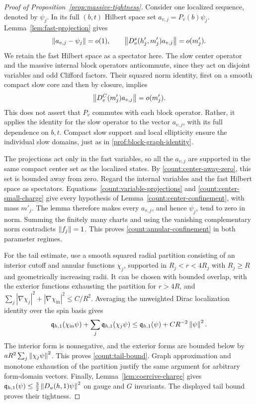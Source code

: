 \begin{proof}[Proof of Proposition~\ref{prop:massive-tightness}]
Consider one localized sequence, denoted by \(\psi_j\). In its full
\((b,t)\) Hilbert space set
\(a_{v,j}=P_v(b)\psi_j\). Lemma~\ref{lem:fast-projection} gives
\begin{equation}\label{count:variable-projections}
 \left\lVert a_{v,j}-\psi_j\right\rVert=o(1),\qquad
 \left\lVert D_v^s(h'_j,m'_j)a_{v,j}\right\rVert=o(m'_j).
\end{equation}
We retain the fast Hilbert space as a spectator here. The slow center
operator and the massive internal block operators anticommute, since
they act on disjoint variables and odd Clifford factors. Their squared
norm identity, first on a smooth compact slow core and then by closure,
implies
\begin{equation}\label{count:center-small-charge}
                    \left\lVert D_v^C(m'_j)a_{v,j}\right\rVert=o(m'_j).
\end{equation}
This does not assert that \(P_v\) commutes with each block operator.
Rather, it applies the identity for the slow operator to the vector
\(a_{v,j}\), with its full dependence on \(b,t\). Compact slow support
and local ellipticity ensure the individual slow domains, just as in
\eqref{prof:block-graph-identity}.

The projections act only in the fast variables, so all the
\(a_{v,j}\) are supported in the same compact center set as the localized
states. By \eqref{count:center-away-zero}, this set is bounded away
from zero. Regard the internal variables and the fast Hilbert space as
spectators. Equations~\eqref{count:variable-projections} and
\eqref{count:center-small-charge} give every hypothesis of
Lemma~\ref{count:center-confinement}, with mass \(m'_j\).
The lemma therefore makes every \(a_{v,j}\), and hence \(\psi_j\),
tend to zero in norm. Summing the finitely many charts and using the
vanishing complementary norm contradicts \(\left\lVert f_j\right\rVert=1\).
This proves \eqref{count:annular-confinement} in both parameter regimes.

For the tail estimate, use a smooth squared radial partition consisting
of an interior cutoff and annular functions \(\chi_j\), supported in
\(R_j<r<4R_j\) with \(R_j\ge R\) and geometrically increasing radii.
It can be chosen with bounded overlap, with the exterior functions
exhausting the partition for \(r>4R\), and
\(\sum_j|\nabla\chi_j|^2+|\nabla\chi_{\mathrm{in}}|^2\le C/R^2\).
Averaging the unweighted Dirac localization identity over the spin basis
gives
\[
 \mathfrak q_{h,1}(\chi_{\mathrm{in}}\psi)+
       \sum_j\mathfrak q_{h,1}(\chi_j\psi)
 \le\mathfrak q_{h,1}(\psi)+CR^{-2}\left\lVert \psi\right\rVert^2.
\]
The interior form is nonnegative, and the exterior forms are bounded
below by \(aR^2\sum_j\left\lVert \chi_j\psi\right\rVert^2\). This proves
\eqref{count:tail-bound}. Graph approximation and monotone exhaustion of
the partition justify the same argument for arbitrary form-domain
vectors. Finally, Lemma~\ref{lem:coercive-charge} gives
\(\mathfrak q_{h,1}(\psi)\le\tfrac32\left\lVert D_u(h,1)\psi\right\rVert^2\) on gauge
and \(G\) invariants. The displayed tail bound proves their tightness.
\end{proof}

